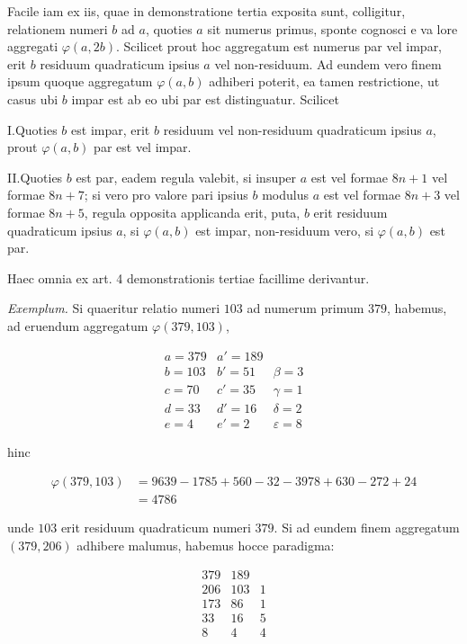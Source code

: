 
Facile iam ex iis, quae in demonstratione tertia exposita sunt, colligitur, relationem numeri $b$ ad $a$, quoties $a$ sit numerus primus, sponte cognosci e va%
%
lore aggregati $\varphi(a,2b)$. Scilicet prout hoc aggregatum est numerus par vel impar, erit $b$ residuum quadraticum ipsius $a$ vel non-residuum. Ad eundem vero finem ipsum quoque aggregatum $\varphi(a,b)$ adhiberi poterit, ea tamen restrictione, ut casus ubi $b$ impar est ab eo ubi par est distinguatur. Scilicet

I.\quad Quoties $b$ est impar, erit $b$ residuum vel non-residuum quadraticum ipsius $a$, prout $\varphi(a,b)$ par est vel impar.

II.\quad Quoties $b$ est par, eadem regula valebit, si insuper $a$ est vel formae $8n+1$ vel formae $8n+7$; si vero pro valore pari ipsius $b$ modulus $a$ est vel formae $8n+3$ vel formae $8n+5$, regula opposita applicanda erit, puta, $b$ erit residuum quadraticum ipsius $a$, si $\varphi(a,b)$ est impar, non-residuum vero, si $\varphi(a,b)$ est par.

Haec omnia ex art. 4 demonstrationis tertiae facillime derivantur.


\textit{Exemplum.} Si quaeritur relatio numeri $103$ ad numerum primum $379$, habemus, ad eruendum aggregatum $\varphi(379,103)$,

\[
\begin{array}{r|r|l}
a=379&a'=189&\\
b=103&b'=51&\beta=3\\
c=70&c'=35&\gamma=1\\
d=33&d'=16&\delta=2\\
e=4&e'=2&\varepsilon=8
\end{array}
\]

hinc

\[
\begin{aligned}
\varphi(379,103)&=9639-1785+560-32-3978+630-272+24\\
&=4786
\end{aligned}
\]

unde $103$ erit residuum quadraticum numeri $379$. Si ad eundem finem aggregatum $(379,206)$ adhibere malumus, habemus hocce paradigma:

\[
\begin{array}{r|r|l}
379&189&\\
206&103&1\\
173&86&1\\
33&16&5\\
8&4&4
\end{array}
\]

